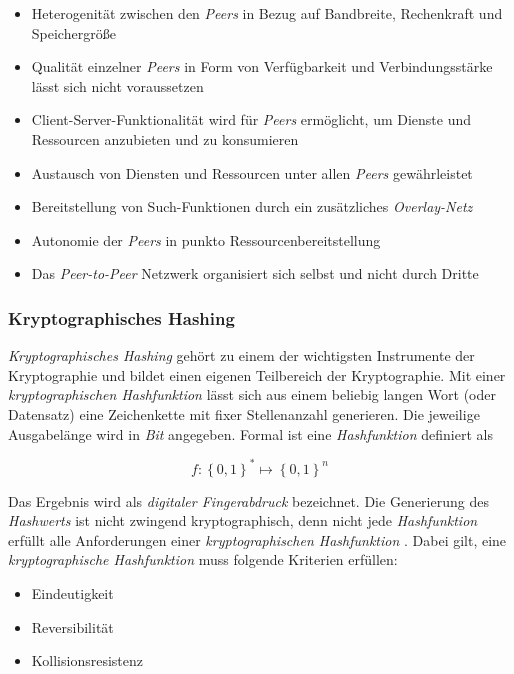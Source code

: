 \begin{itemize}
  \item Heterogenität zwischen den \textit{Peers} in Bezug auf Bandbreite, Rechenkraft und Speichergröße
  \item Qualität einzelner \textit{Peers} in Form von Verfügbarkeit und Verbindungsstärke lässt sich nicht voraussetzen
  \item Client-Server-Funktionalität wird für \textit{Peers} ermöglicht, um Dienste und Ressourcen anzubieten und zu konsumieren
  \item Austausch von Diensten und Ressourcen unter allen \textit{Peers} gewährleistet
  \item Bereitstellung von Such-Funktionen durch ein zusätzliches \textit{Overlay-Netz}
  \item Autonomie der \textit{Peers} in punkto Ressourcenbereitstellung
  \item Das \textit{Peer-to-Peer} Netzwerk organisiert sich selbst und nicht durch Dritte
\end{itemize}

\subsubsection{Kryptographisches Hashing}
\textit{Kryptographisches Hashing} gehört zu einem der wichtigsten Instrumente der Kryptographie und bildet einen eigenen Teilbereich der Kryptographie. Mit einer \textit{kryptographischen Hashfunktion} lässt sich aus einem beliebig langen Wort (oder Datensatz) eine Zeichenkette mit fixer Stellenanzahl generieren. Die jeweilige Ausgabelänge wird in \textit{Bit} angegeben. Formal ist eine \textit{Hashfunktion} definiert als

\begin{equation}
	f:\left \{ 0,1 \right \}^{*} \mapsto \left \{ 0,1 \right \}^{n}
\end{equation}

\noindent
Das Ergebnis wird als \textit{digitaler Fingerabdruck} bezeichnet. Die Generierung des \textit{Hashwerts} ist nicht zwingend kryptographisch, denn nicht jede \textit{Hashfunktion} erfüllt alle Anforderungen einer \textit{kryptographischen Hashfunktion} \citep{Menezes1997, Diffie1976}. Dabei gilt, eine \textit{kryptographische Hashfunktion} muss folgende Kriterien erfüllen:

\begin{itemize}
	\item Eindeutigkeit
	\item Reversibilität
	\item Kollisionsresistenz
\end{itemize}

